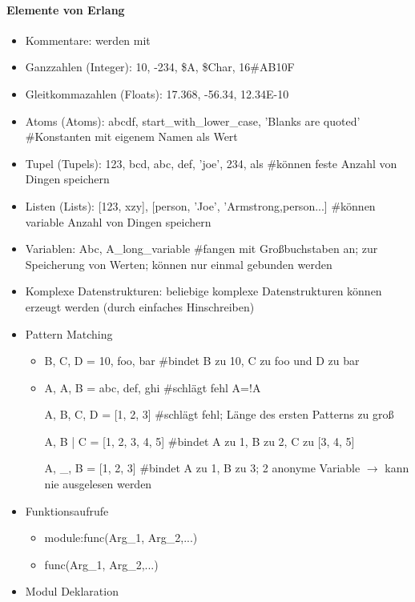 \documentclass[10pt]{article}
\begin{document}
\paragraph{Elemente von Erlang}
\begin{itemize}
  \item Kommentare: werden mit %
  \item Ganzzahlen (Integer): 10, -234, \$A, \$Char, 16\#AB10F
  \item Gleitkommazahlen (Floats): 17.368, -56.34, 12.34E-10
  \item Atoms (Atoms): abcdf, start\_with\_lower\_case, 'Blanks are quoted' \#Konstanten mit eigenem Namen als Wert
  \item Tupel (Tupels): {123, bcd}, {abc, {def, 'joe', 234}, als} \#können feste Anzahl von Dingen speichern
  \item Listen (Lists): [123, xzy], [{person, 'Joe', 'Armstrong},{person...}] \#können variable Anzahl von Dingen speichern
  \item Variablen: Abc, A\_long\_variable \#fangen mit Großbuchstaben an; zur Speicherung von Werten; können nur einmal gebunden werden
  \item Komplexe Datenstrukturen: beliebige komplexe Datenstrukturen können erzeugt werden (durch einfaches Hinschreiben)
  \item Pattern Matching
        \begin{itemize}
          \item {B, C, D} = {10, foo, bar} \#bindet B zu 10, C zu foo und D zu bar
          \item {A, A, B} = {abc, def, ghi} \#schlägt fehl A=!A
          \item [A, B, C, D] = [1, 2, 3] \#schlägt fehl; Länge des ersten Patterns zu groß
          \item [A, B | C] = [1, 2, 3, 4, 5] \#bindet A zu 1, B zu 2, C zu [3, 4, 5]
          \item [A, \_, B ] = [1, 2, 3] \#bindet A zu 1, B zu 3; 2 anonyme Variable $\rightarrow$ kann nie ausgelesen werden
        \end{itemize}
  \item Funktionsaufrufe
        \begin{itemize}
          \item module:func(Arg\_1, Arg\_2,...)
          \item func(Arg\_1, Arg\_2,...)
        \end{itemize}
  \item Modul Deklaration

\end{itemize}
\end{document}
